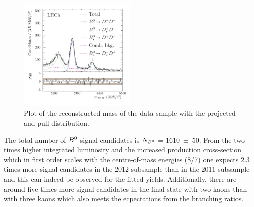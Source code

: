 \begin{figure}[!htb]
\centering
\includegraphics[width=0.5\textwidth]{07-B02DD/tikz/pdf/obsMass_summed_pull.pdf}
\caption{Plot of the reconstructed mass of the \BdToDD data sample with the
projected \PDF and pull distribution.
}
\label{fig:massfit}
\end{figure}
%
The total number of ${{B}^0}$ signal candidates is $N_{{{B}^0}}$ = \num{1610\pm50}.
From the two times higher integrated luminosity and the increased production
cross-section which in first order scales with the centre-of-mass energies
(8/7) one expects \num{2.3} times more signal candidates in the 2012 subsample
than in the 2011 subsample and this can indeed be observed for the fitted
yields. Additionally, there are around five times more signal candidates in
the final state with two kaons than with three kaons which also meets the
ecpectations from the branching ratios.

\FloatBarrier